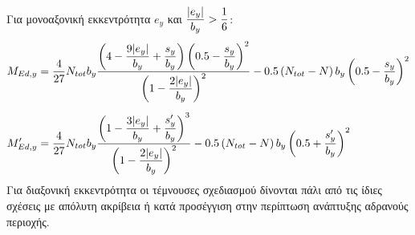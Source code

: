 Για μονοαξονική εκκεντρότητα $e_y$ και $\dfrac{\lvert e_y\rvert}{b_y} > \dfrac{1}{6}$:
\begin{subequations}
\begin{align}
  M_{Ed,y} & = \dfrac{4}{27}N_{tot}b_y\dfrac{\left(4 - \dfrac{9\lvert e_y\rvert}{b_y} + \dfrac{s_y}{b_y}\right)\left(0.5 - \dfrac{s_y}{b_y}\right)^2}{\left(1-\dfrac{2\lvert e_y\rvert}{b_y}\right)^2} - 0.5\left(N_{tot} - N\right)b_y\left(0.5 - \dfrac{s_y}{b_y}\right)^2 \label{eqn:225a}\\[5pt]
  M'_{Ed,y} & = \dfrac{4}{27}N_{tot}b_y\dfrac{\left(1 - \dfrac{3\lvert e_y\rvert}{b_y} + \dfrac{s'_y}{b_y}\right)^3}{\left(1-\dfrac{2\lvert e_y\rvert}{b_y}\right)^2} - 0.5\left(N_{tot} - N\right)b_y\left(0.5 + \dfrac{s'_y}{b_y}\right)^2 \label{eqn:225b}
\end{align}
\end{subequations}
Για διαξονική εκκεντρότητα οι τέμνουσες σχεδιασμού δίνονται πάλι από τις ίδιες σχέσεις με απόλυτη ακρίβεια ή κατά προσέγγιση στην περίπτωση ανάπτυξης αδρανούς περιοχής.
